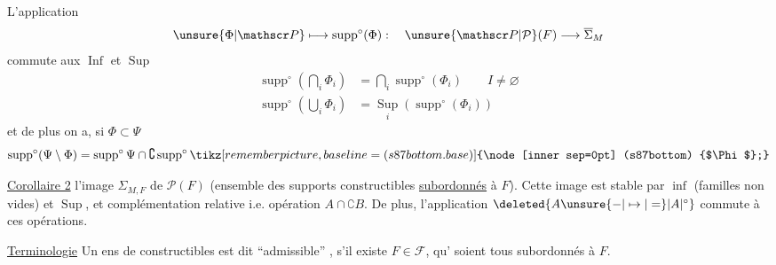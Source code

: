 \begin{samepage}
\noindent{} L'application
\[
\unsure{\Phi|\mathscr P}\longmapsto\operatorname{supp}^{\circ}(\Phi):\quad\unsure{\mathscr P|\mathcal P}(F)\longrightarrow\overline\Sigma_M
\]
commute aux $\operatorname{Inf}$ et $\operatorname{Sup}$
\[
\begin{aligned}
\operatorname{supp}^{\circ}\left(\bigcap_i\Phi_i\right)&=\bigcap_i\operatorname{supp}^{\circ}(\Phi_i)\qquad I\neq\varnothing\\
\operatorname{supp}^{\circ}\left(\bigcup_i\Phi_i\right)&=\operatorname*{Sup}_i(\operatorname{supp}^{\circ}(\Phi_i))
\end{aligned}
\]
et de plus on a, si $\Phi\subset\Psi$
\[
\operatorname{supp}^{\circ}(\Psi\setminus\Phi)=\operatorname{supp}^{\circ}\Psi\cap\complement\operatorname{supp}^{\circ}\tikz[remember picture,baseline=(s87bottom.base)]{\node[inner sep=0pt] (s87bottom) {$\Phi$};}
\]
\end{samepage}

\uline{Corollaire 2}   l'image $\Sigma_{M,F}$ de $\mathscr P(F)$ (ensemble des supports constructibles \uline{subordonnés} à $F$). Cette image est stable  par $\operatorname{inf}$ (familles non vides) et $\operatorname{Sup}$, et complémentation relative i.e. opération $A\cap\complement B$. De plus, l'application $\deleted{A\unsure{-|\mapsto|=} |A|^{\circ}}$
commute à ces opérations.

\uline{Terminologie} Un ens de  constructibles  est dit ``admissible'' , s'il existe $F\in\mathscr F$,  qu' soient tous  subordonnés à $F$.

